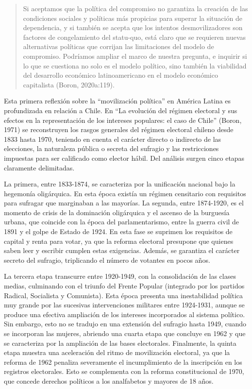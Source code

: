 \begin{quote}
Si aceptamos que la política del compromiso no garantiza la creación de las condiciones sociales y políticas más propicias para superar la situación de dependencia, y si también se acepta que los intentos desmovilizadores son factores de congelamiento del statu-quo, está claro que se requieren nuevas alternativas políticas que corrijan las limitaciones del modelo de compromiso. Podríamos ampliar el marco de nuestra pregunta, e inquirir si lo que se cuestiona no solo es el modelo político, sino también la viabilidad del desarrollo económico latinoamericano en el modelo económico capitalista (Boron, 2020a:119).
\end{quote}

Esta primera reflexión sobre la ``movilización política'' en América Latina es profundizada en relación a Chile. En ``La evolución del régimen electoral y sus efectos en la representación de los intereses populares: el caso de Chile'' (Boron, 1971) se reconstruyen los rasgos generales del régimen electoral chileno desde 1833 hasta 1970, teniendo en cuenta el carácter directo o indirecto de las elecciones, la naturaleza pública o secreta del sufragio y las restricciones impuestas para ser calificado como elector hábil. Del análisis surgen cinco etapas claramente delimitadas.

La primera, entre 1833-1874, se caracteriza por la unificación nacional bajo la hegemonía oligárquica. En esta época existía un régimen censitario con requisitos para sufragar que marginaban a las mayorías. La segunda, entre 1874-1920, es el momento de crisis de la dominación oligárquica y el ascenso de la burguesía urbana, que coincide con la época del parlamentarismo, entre la guerra civil de 1891 y el golpe de Estado de 1924. En esta fase se suprimen los requisitos de capital y renta para votar, ya que la reforma electoral presupone que quienes saben leer y escribir cumplen estas exigencias. Además, se garantiza el carácter secreto del sufragio, triplicando el número de votantes en pocos años.

La tercera etapa transcurre entre 1920-1949, con la consolidación de las clases medias, culminando con el triunfo del Frente Popular (integrado por los partidos Radical, Socialista y Comunista). Esta época presenta una inestabilidad política muy grande por las sucesivas intervenciones militares entre 1924-1931, aunque se produce una efectiva ampliación de los intereses incorporados al sistema político. Sin embargo, esto no se tradujo en una extensión del sufragio hasta 1949, cuando se incorporan las mujeres, abriendo una cuarta etapa que concluye en 1962 y que se caracteriza por la ampliación de las bases electorales. Finalmente, la quinta etapa muestra una aceleración del ritmo de movilización electoral, ya que la reforma de 1962 penaliza severamente el incumplimiento de la inscripción en los registros electorales. Esto se complementa con la reforma constitucional de 1970, que concede derechos políticos a los analfabetos y mayores de 18 años.

